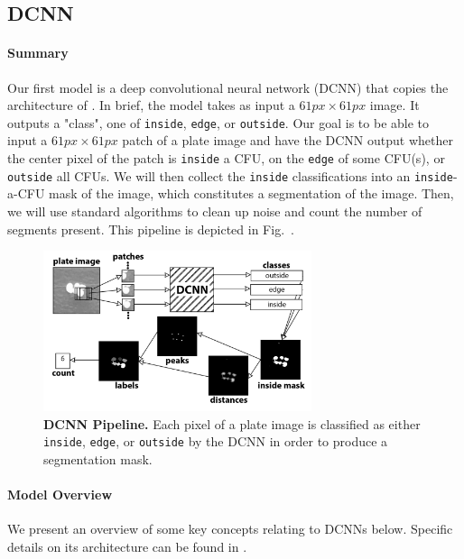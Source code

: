 \documentclass[10pt,letterpaper]{article}
\begin{document}
    \subsection*{DCNN} \label{ssec:dcnn}
        \paragraph*{Summary}
            Our first model is a deep convolutional neural network (DCNN) that copies the architecture of \cite{Valen}. In brief, the model takes as input a $61px \times 61px$ image. It outputs a "class", one of \texttt{inside}, \texttt{edge}, or \texttt{outside}. Our goal is to be able to input a $61px \times 61px$ patch of a plate image and have the DCNN output whether the center pixel of the patch is \texttt{inside} a CFU, on the \texttt{edge} of some CFU(s), or \texttt{outside} all CFUs. We will then collect the \texttt{inside} classifications into an \texttt{inside}-a-CFU mask of the image, which constitutes a segmentation of the image. Then, we will use standard algorithms to clean up noise and count the number of segments present. This pipeline is depicted in Fig.~\cite{dcnn_pipeline}.
            
            \begin{figure}[h]
                \graphicspath{{results/derived/}}
                \includegraphics[width=0.7\textwidth]{dcnn_pipeline2}
                \caption{{\bf DCNN Pipeline.} Each pixel of a plate image is classified as either \texttt{inside}, \texttt{edge}, or \texttt{outside} by the DCNN in order to produce a segmentation mask.}
                \label{dcnn_pipeline}
            \end{figure}
        
    
        \paragraph*{Model Overview}
            We present an overview of some key concepts relating to DCNNs below. Specific details on its architecture can be found in .
        
\end{document}
